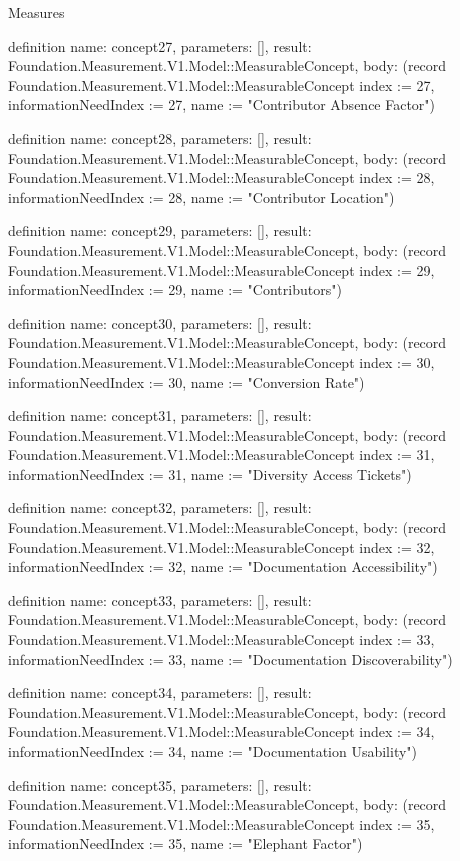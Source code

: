 \begin{lexlean}{Measures}
\begin{semanticmodule}
definition{
  name: concept27,
  parameters: [],
  result: Foundation.Measurement.V1.Model::MeasurableConcept,
  body: (record Foundation.Measurement.V1.Model::MeasurableConcept {index := 27, informationNeedIndex := 27, name := "Contributor Absence Factor"})
}

definition{
  name: concept28,
  parameters: [],
  result: Foundation.Measurement.V1.Model::MeasurableConcept,
  body: (record Foundation.Measurement.V1.Model::MeasurableConcept {index := 28, informationNeedIndex := 28, name := "Contributor Location"})
}

definition{
  name: concept29,
  parameters: [],
  result: Foundation.Measurement.V1.Model::MeasurableConcept,
  body: (record Foundation.Measurement.V1.Model::MeasurableConcept {index := 29, informationNeedIndex := 29, name := "Contributors"})
}

definition{
  name: concept30,
  parameters: [],
  result: Foundation.Measurement.V1.Model::MeasurableConcept,
  body: (record Foundation.Measurement.V1.Model::MeasurableConcept {index := 30, informationNeedIndex := 30, name := "Conversion Rate"})
}

definition{
  name: concept31,
  parameters: [],
  result: Foundation.Measurement.V1.Model::MeasurableConcept,
  body: (record Foundation.Measurement.V1.Model::MeasurableConcept {index := 31, informationNeedIndex := 31, name := "Diversity Access Tickets"})
}

definition{
  name: concept32,
  parameters: [],
  result: Foundation.Measurement.V1.Model::MeasurableConcept,
  body: (record Foundation.Measurement.V1.Model::MeasurableConcept {index := 32, informationNeedIndex := 32, name := "Documentation Accessibility"})
}

definition{
  name: concept33,
  parameters: [],
  result: Foundation.Measurement.V1.Model::MeasurableConcept,
  body: (record Foundation.Measurement.V1.Model::MeasurableConcept {index := 33, informationNeedIndex := 33, name := "Documentation Discoverability"})
}

definition{
  name: concept34,
  parameters: [],
  result: Foundation.Measurement.V1.Model::MeasurableConcept,
  body: (record Foundation.Measurement.V1.Model::MeasurableConcept {index := 34, informationNeedIndex := 34, name := "Documentation Usability"})
}

definition{
  name: concept35,
  parameters: [],
  result: Foundation.Measurement.V1.Model::MeasurableConcept,
  body: (record Foundation.Measurement.V1.Model::MeasurableConcept {index := 35, informationNeedIndex := 35, name := "Elephant Factor"})
}


\end{semanticmodule}
\end{lexlean}
